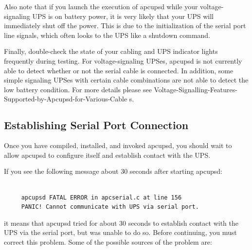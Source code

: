 {{{{{{{{{{Also note that if you launch the execution of apcupsd while your
voltage-signaling UPS is on battery power, it is very likely that your UPS
will immediately shut off the power. This is due to the initialization of the
serial port line signals, which often looks to the UPS like a shutdown
command.  

Finally, double-check the state of your cabling and UPS indicator lights
frequently during testing.  For voltage-signaling UPSes, apcupsd is not
currently able to detect whether or not the serial cable is connected. In
addition, some simple signaling UPSes with certain cable combinations are not
able to detect the low battery condition.  For more details please see 
{Voltage-Signalling-Features-Supported-by-Apcupsd-for-Various-Cable%
s}. 

\label{Establishing-Serial-Port-Connection}

\subsection*{Establishing Serial Port Connection}

\label{index-Testing_002c-Serial-221}
Once you have compiled, installed, and invoked apcupsd, you should wait to
allow apcupsd to configure itself and establish contact with the UPS.  

If you see the following message about 30 seconds after starting apcupsd: 

\footnotesize
\begin{verbatim}
     
     apcupsd FATAL ERROR in apcserial.c at line 156
     PANIC! Cannot communicate with UPS via serial port.
\end{verbatim}
\normalsize

it means that apcupsd tried for about 30 seconds to establish contact with the
UPS via the serial port, but was unable to do so. Before continuing, you must
correct this problem. Some of the possible sources of the problem are:  

}}}}}}}}}}
